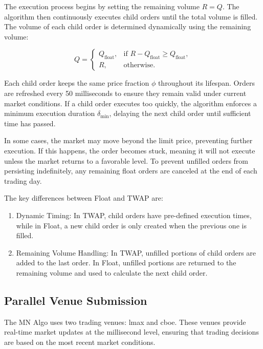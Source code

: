 The execution process begins by setting the remaining volume $R = Q$. The algorithm then continuously executes child orders until the total volume is filled. The volume of each child order is determined dynamically using the remaining volume:

\begin{equation}
    Q = 
    \begin{cases} 
        Q_{\text{float}}, & \text{if } R - Q_{\text{float}} \geq Q_{\text{float}}, \\
        R, & \text{otherwise}.
    \end{cases}
\end{equation}

Each child order keeps the same price fraction $\phi$ throughout its lifespan. Orders are refreshed every 50 milliseconds to ensure they remain valid under current market conditions. If a child order executes too quickly, the algorithm enforces a minimum execution duration $\delta_{\text{min}}$, delaying the next child order until sufficient time has passed.

In some cases, the market may move beyond the limit price, preventing further execution. If this happens, the order becomes stuck, meaning it will not execute unless the market returns to a favorable level. To prevent unfilled orders from persisting indefinitely, any remaining float orders are canceled at the end of each trading day.

The key differences between Float and TWAP are:
\begin{enumerate}
    \item Dynamic Timing: In TWAP, child orders have pre-defined execution times, while in Float, a new child order is only created when the previous one is filled.
    \item Remaining Volume Handling: In TWAP, unfilled portions of child orders are added to the last order. In Float, unfilled portions are returned to the remaining volume and used to calculate the next child order.
\end{enumerate}

\subsection{Parallel Venue Submission}
The MN Algo uses two trading venues: \acrshort{lmax} and \acrshort{cboe}. These venues provide real-time market updates at the millisecond level, ensuring that trading decisions are based on the most recent market conditions. 

